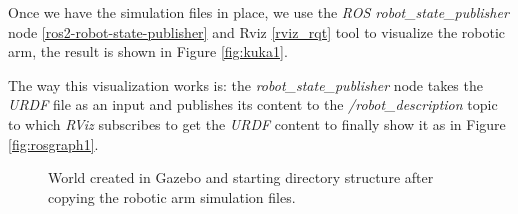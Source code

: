 \documentclass[12pt,oneside]{article}
\begin{document}
Once we have the simulation files in place, we use the \textit{ROS robot\_state\_publisher} node \ref{ros2-robot-state-publisher} and Rviz \ref{rviz_rqt} tool to visualize the robotic arm, the result is shown in Figure \ref{fig:kuka1}.

The way this visualization works is: the \textit{robot\_state\_publisher} node takes the \textit{URDF} file as an input and publishes its content to the \textit{/robot\_description} topic to which \textit{RViz} subscribes to get the \textit{URDF} content to finally show it as in Figure \ref{fig:rosgraph1}. 
\begin{figure}[H]
  \centering
  \hfill
  \caption{World created in Gazebo and starting directory structure after copying the robotic arm simulation files.}
\end{figure}
\end{document}
